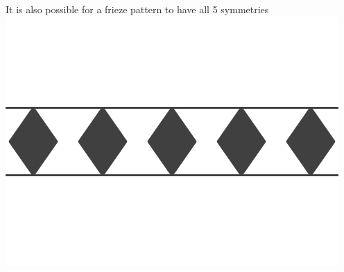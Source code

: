 \documentclass[noauthor,nooutcomes,hints,handout]{../ximera}
\begin{document}
It is also possible for a frieze pattern to have all 5 symmetries
\includegraphics{7TGRFF.png}

%
%
\end{document}
